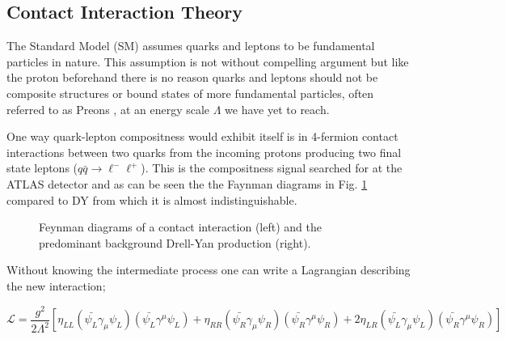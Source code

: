     \subsection{Contact Interaction Theory}

        The Standard Model (SM) assumes quarks and leptons to be fundamental particles in nature. This assumption is not without compelling argument but like the proton beforehand there is no reason quarks and leptons should not be composite structures or bound states of more fundamental particles, often referred to as Preons \cite{Eichten:1983hw}, at an energy scale $\Lambda$ we have yet to reach. 

        One way quark-lepton compositness would exhibit itself is in 4-fermion contact interactions between two quarks from the incoming protons producing two final state leptons ($q\bar{q} \rightarrow \ell^{-}\ell^{+}$). This is the compositness signal searched for at the ATLAS detector and as can be seen the the Faynman diagrams in Fig. \ref{fig:fd} compared to DY from which it is almost indistinguishable.

        \begin{figure}[h]
            \begin{center}
            \end{center}
            \caption{Feynman diagrams of a contact interaction (left) and the predominant background Drell-Yan production (right).}
            \label{fig:fd}
        \end{figure}

        Without knowing the intermediate process one can write a Lagrangian describing the new interaction; 

        \begin{equation}
            \mathcal{L} = \frac{g^{2}}{2\Lambda^{2}}
                [\eta_{LL} (\bar{\psi_{L}}\gamma_{\mu}\psi_{L}) (\bar{\psi_{L}}\gamma^{\mu}\psi_{L}) 
                + \eta_{RR} (\bar{\psi_{R}}\gamma_{\mu}\psi_{R}) (\bar{\psi_{R}}\gamma^{\mu}\psi_{R}) 
                + 2\eta_{LR} (\bar{\psi_{L}}\gamma_{\mu}\psi_{L}) (\bar{\psi_{R}}\gamma^{\mu}\psi_{R}) ]
        \end{equation}

